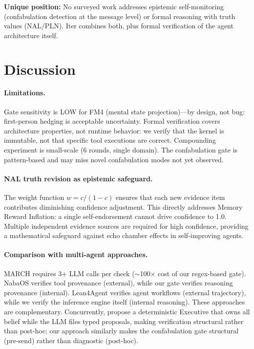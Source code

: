 \documentclass{article}
\begin{document}
\textbf{Unique position:} No surveyed work addresses epistemic self-monitoring (confabulation detection at the message level) or formal reasoning with truth values (NAL/PLN). Iter combines both, plus formal verification of the agent architecture itself.

\section{Discussion}
\label{sec:discussion}

\paragraph{Limitations.} Gate sensitivity is LOW for FM4 (mental state projection)—by design, not bug: first-person hedging is acceptable uncertainty. Formal verification covers architecture properties, not runtime behavior: we verify that the kernel is immutable, not that specific tool executions are correct. Compounding experiment is small-scale (6 rounds, single domain). The confabulation gate is pattern-based and may miss novel confabulation modes not yet observed.

\paragraph{NAL truth revision as epistemic safeguard.} The weight function $w = c/(1-c)$ ensures that each new evidence item contributes diminishing confidence adjustment. This directly addresses Memory Reward Inflation: a single self-endorsement cannot drive confidence to 1.0. Multiple independent evidence sources are required for high confidence, providing a mathematical safeguard against echo chamber effects in self-improving agents.

\paragraph{Comparison with multi-agent approaches.} MARCH requires 3+ LLM calls per check ($\sim$100$\times$ cost of our regex-based gate). NabaOS verifies tool provenance (external), while our gate verifies reasoning provenance (internal). Lean4Agent verifies agent workflows (external trajectory), while we verify the inference engine itself (internal reasoning). These approaches are complementary. Concurrently, \citet{llmproposes} propose a deterministic Executive that owns all belief while the LLM files typed proposals, making verification structural rather than post-hoc; our approach similarly makes the confabulation gate structural (pre-send) rather than diagnostic (post-hoc).
\end{document}
